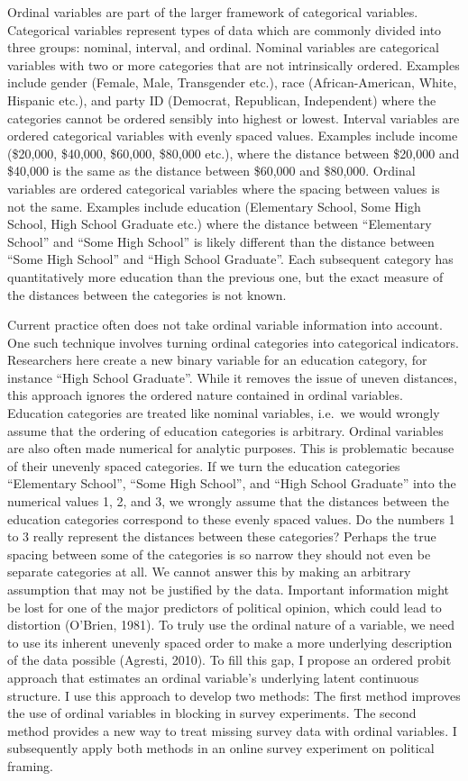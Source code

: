 \documentclass[12pt,econ]{sources/authesis}
\begin{document}
Ordinal variables are part of the larger framework of categorical variables. Categorical variables represent types of data which are commonly divided into three groups: nominal, interval, and ordinal. Nominal variables are categorical variables with two or more categories that are not intrinsically ordered. Examples include gender (Female, Male, Transgender etc.), race (African-American, White, Hispanic etc.), and party ID (Democrat, Republican, Independent) where the categories cannot be ordered sensibly into highest or lowest. Interval variables are ordered categorical variables with evenly spaced values. Examples include income (\$20,000, \$40,000, \$60,000, \$80,000 etc.), where the distance between \$20,000 and \$40,000 is the same as the distance between \$60,000 and \$80,000. Ordinal variables are ordered categorical variables where the spacing between values is not the same. Examples include education (Elementary School, Some High School, High School Graduate etc.) where the distance between ``Elementary School'' and ``Some High School'' is likely different than the distance between ``Some High School'' and ``High School Graduate''. Each subsequent category has quantitatively more education than the previous one, but the exact measure of the distances between the categories is not known.

Current practice often does not take ordinal variable information into account. One such technique involves turning ordinal categories into categorical indicators. Researchers here create a new binary variable for an education category, for instance ``High School Graduate''. While it removes the issue of uneven distances, this approach ignores the ordered nature contained in ordinal variables. Education categories are treated like nominal variables, i.e.~we would wrongly assume that the ordering of education categories is arbitrary. Ordinal variables are also often made numerical for analytic purposes. This is problematic because of their unevenly spaced categories. If we turn the education categories ``Elementary School'', ``Some High School'', and ``High School Graduate'' into the numerical values 1, 2, and 3, we wrongly assume that the distances between the education categories correspond to these evenly spaced values. Do the numbers 1 to 3 really represent the distances between these categories? Perhaps the true spacing between some of the categories is so narrow they should not even be separate categories at all. We cannot answer this by making an arbitrary assumption that may not be justified by the data. Important information might be lost for one of the major predictors of political opinion, which could lead to distortion (O'Brien, 1981). To truly use the ordinal nature of a variable, we need to use its inherent unevenly spaced order to make a more underlying description of the data possible (Agresti, 2010). To fill this gap, I propose an ordered probit approach that estimates an ordinal variable's underlying latent continuous structure. I use this approach to develop two methods: The first method improves the use of ordinal variables in blocking in survey experiments. The second method provides a new way to treat missing survey data with ordinal variables. I subsequently apply both methods in an online survey experiment on political framing.
\end{document}
